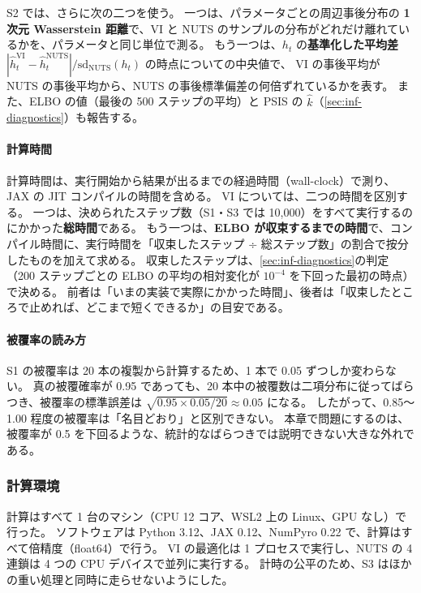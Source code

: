S2 では、さらに次の二つを使う。
一つは、パラメータごとの周辺事後分布の \textbf{1 次元 Wasserstein 距離}で、VI と NUTS のサンプルの分布がどれだけ離れているかを、パラメータと同じ単位で測る。
もう一つは、$h_t$ の\textbf{基準化した平均差} $|\hat h_t^{\mathrm{VI}} - \hat h_t^{\mathrm{NUTS}}| / \mathrm{sd}_{\mathrm{NUTS}}(h_t)$ の時点についての中央値で、
VI の事後平均が NUTS の事後平均から、NUTS の事後標準偏差の何倍ずれているかを表す。
また、ELBO の値（最後の 500 ステップの平均）と PSIS の $\hat k$（\cref{sec:inf-diagnostics}）も報告する。

\paragraph{計算時間}
計算時間は、実行開始から結果が出るまでの経過時間（wall-clock）で測り、JAX の JIT コンパイルの時間を含める。
VI については、二つの時間を区別する。
一つは、決められたステップ数（S1・S3 では 10,000）をすべて実行するのにかかった\textbf{総時間}である。
もう一つは、\textbf{ELBO が収束するまでの時間}で、コンパイル時間に、実行時間を「収束したステップ ÷ 総ステップ数」の割合で按分したものを加えて求める。
収束したステップは、\cref{sec:inf-diagnostics}の判定（200 ステップごとの ELBO の平均の相対変化が $10^{-4}$ を下回った最初の時点）で決める。
前者は「いまの実装で実際にかかった時間」、後者は「収束したところで止めれば、どこまで短くできるか」の目安である。

\paragraph{被覆率の読み方}
S1 の被覆率は 20 本の複製から計算するため、1 本で 0.05 ずつしか変わらない。
真の被覆確率が 0.95 であっても、20 本中の被覆数は二項分布に従ってばらつき、被覆率の標準誤差は $\sqrt{0.95 \times 0.05 / 20} \approx 0.05$ になる。
したがって、0.85〜1.00 程度の被覆率は「名目どおり」と区別できない。
本章で問題にするのは、被覆率が 0.5 を下回るような、統計的なばらつきでは説明できない大きな外れである。

\subsubsection{計算環境}
計算はすべて 1 台のマシン（CPU 12 コア、WSL2 上の Linux、GPU なし）で行った。
ソフトウェアは Python 3.12、JAX 0.12、NumPyro 0.22 で、計算はすべて倍精度（float64）で行う。
VI の最適化は 1 プロセスで実行し、NUTS の 4 連鎖は 4 つの CPU デバイスで並列に実行する。
計時の公平のため、S3 はほかの重い処理と同時に走らせないようにした。

